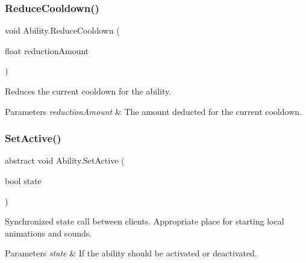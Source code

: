 \hypertarget{class_ability_ad16a83f1ae0811435b1ab91cf954ece9}{}\label{class_ability_ad16a83f1ae0811435b1ab91cf954ece9} 
\subsubsection{\texorpdfstring{Reduce\+Cooldown()}{ReduceCooldown()}}
{\footnotesize\ttfamily void Ability.\+Reduce\+Cooldown (\begin{DoxyParamCaption}\item[{float}]{reduction\+Amount }\end{DoxyParamCaption})}



Reduces the current cooldown for the ability. 


\begin{DoxyParams}{Parameters}
{\em reduction\+Amount} & The amount deducted for the current cooldown.\\
\hline
\end{DoxyParams}
\hypertarget{class_ability_a10f7f3c2b63eeef6e352aee48d246384}{}\label{class_ability_a10f7f3c2b63eeef6e352aee48d246384} 
\subsubsection{\texorpdfstring{Set\+Active()}{SetActive()}}
{\footnotesize\ttfamily abstract void Ability.\+Set\+Active (\begin{DoxyParamCaption}\item[{bool}]{state }\end{DoxyParamCaption})\hspace{0.3cm}{\ttfamily [pure virtual]}}



Synchronized state call between clients. Appropriate place for starting local animations and sounds. 


\begin{DoxyParams}{Parameters}
{\em state} & If the ability should be activated or deactivated.\\
\hline
\end{DoxyParams}


